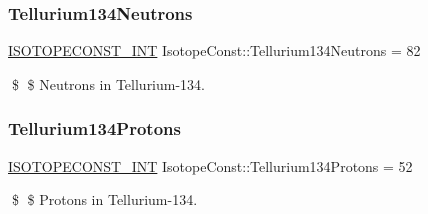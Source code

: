\subsubsection{\texorpdfstring{Tellurium134\+Neutrons}{Tellurium134Neutrons}}
{\footnotesize\ttfamily \mbox{\hyperlink{group___isotope_const-_macros_ga5f18360b3e99483a35c32d789e62621c}{I\+S\+O\+T\+O\+P\+E\+C\+O\+N\+S\+T\+\_\+\+I\+NT}} Isotope\+Const\+::\+Tellurium134\+Neutrons = 82}

\$ \$ Neutrons in Tellurium-\/134. \mbox{\label{group___isotope_const-_tellurium-_te134_ga14601e52d1e991ac72589673ce2de137}} 
\subsubsection{\texorpdfstring{Tellurium134\+Protons}{Tellurium134Protons}}
{\footnotesize\ttfamily \mbox{\hyperlink{group___isotope_const-_macros_ga5f18360b3e99483a35c32d789e62621c}{I\+S\+O\+T\+O\+P\+E\+C\+O\+N\+S\+T\+\_\+\+I\+NT}} Isotope\+Const\+::\+Tellurium134\+Protons = 52}

\$ \$ Protons in Tellurium-\/134. 